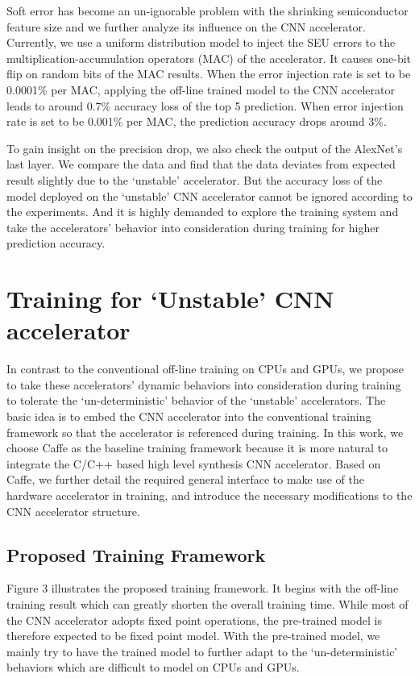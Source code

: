   Soft error has become an un-ignorable problem with the shrinking semiconductor 
feature size and we further analyze its influence on the CNN accelerator. 
Currently, we use a uniform distribution model to inject the SEU errors to the 
multiplication-accumulation operators (MAC) of the accelerator. It causes one-bit 
flip on random bits of the MAC results. When the error injection rate is set to 
be 0.0001\% per MAC, applying the off-line trained model to the CNN accelerator 
leads to around 0.7\% accuracy loss of the top 5 prediction. When error injection 
rate is set to be 0.001\% per MAC, the prediction accuracy drops around 3\%.

  To gain insight on the precision drop, we also check the output of the AlexNet’s last 
layer. We compare the data and find that the data deviates from expected result slightly 
due to the ‘unstable’ accelerator. But the accuracy loss of the model deployed on 
the ‘unstable’ CNN accelerator cannot be ignored according to the experiments. 
And it is highly demanded to explore the training 
system and take the accelerators’ behavior into consideration during training for higher prediction accuracy.

\section{Training for ‘Unstable’ CNN accelerator} \label{sec:framework}
  In contrast to the conventional off-line training on CPUs and GPUs, we propose 
to take these accelerators’ dynamic behaviors into consideration during training 
to tolerate the ‘un-deterministic’ behavior of the ‘unstable’ accelerators. The basic 
idea is to embed the CNN accelerator into the conventional training framework so that 
the accelerator is referenced during training. In this work, we choose Caffe as the baseline 
training framework because it is more natural to integrate the C/C++ based high 
level synthesis CNN accelerator. Based on Caffe, we further detail the required general 
interface to make use of the hardware accelerator in training, and introduce 
the necessary modifications to the CNN accelerator structure. 
\subsection{Proposed Training Framework }
  Figure 3 illustrates the proposed training framework. It begins with the 
off-line training result which can greatly shorten the overall training time. 
While most of the CNN accelerator adopts fixed point operations, the pre-trained model 
is therefore expected to be fixed point model. With the pre-trained model, 
we mainly try to have the trained model to further adapt to the ‘un-deterministic’ 
behaviors which are difficult to model on CPUs and GPUs.


